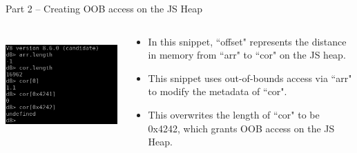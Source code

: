 \begin{frame}{Part 2 -- Creating OOB access on the JS Heap}
    \begin{columns}
        \begin{column}{0.5\textwidth}
            \inputminted[]{js}{code/exploit-2.tex}
            \includegraphics[width=\textwidth]{images/v8-length-screenshot.png}
        \end{column}
        \begin{column}{0.5\textwidth}
            \begin{itemize}
                \item In this snippet, ``offset" represents the distance in memory from ``arr" to ``cor" on the JS heap. 
                \item This snippet uses out-of-bounds access via ``arr" to modify the metadata of ``cor".
                \item This overwrites the length of ``cor" to be 0x4242, which grants OOB access on the JS Heap. 
            \end{itemize}
        \end{column}
    \end{columns}
\end{frame}

